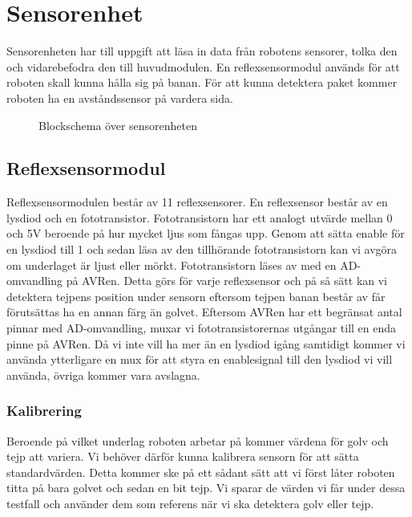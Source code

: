 %

\section{Sensorenhet}
Sensorenheten har till uppgift att läsa in data från robotens sensorer, tolka den och vidarebefodra den till huvudmodulen. En reflexsensormodul används för att roboten skall kunna hålla sig på banan. För att kunna detektera paket kommer roboten ha en avståndssensor på vardera sida. \\

\begin{figure}[h]
\center

\caption{Blockschema över sensorenheten}
\end{figure}

\subsection{Reflexsensormodul}
Reflexsensormodulen består av 11 reflexsensorer. En reflexsensor består av en lysdiod och en fototransistor. Fototransistorn har ett analogt utvärde mellan 0 och 5V beroende på hur mycket ljus som fångas upp. Genom att sätta enable för en lysdiod till 1 och sedan läsa av den tillhörande fototransistorn kan vi avgöra om underlaget är ljust eller mörkt. Fototransistorn läses av med en AD-omvandling på AVRen. Detta görs för varje reflexsensor och på så sätt kan vi detektera tejpens position under sensorn eftersom tejpen banan består av får förutsättas ha en annan färg än golvet. Eftersom AVRen har ett begränsat antal pinnar med AD-omvandling, muxar vi fototransistorernas utgångar till en enda pinne på AVRen. Då vi inte vill ha mer än en lysdiod igång samtidigt kommer vi använda ytterligare en mux för att styra en enablesignal till den lysdiod vi vill använda, övriga kommer vara avslagna.

\subsubsection{Kalibrering}
Beroende på vilket underlag roboten arbetar på kommer värdena för golv och tejp att variera. Vi behöver därför kunna kalibrera sensorn för att sätta standardvärden. Detta kommer ske på ett sådant sätt att vi först låter roboten titta på bara golvet och sedan en bit tejp. Vi sparar de värden vi får under dessa testfall och använder dem som referens när vi ska detektera golv eller tejp.

